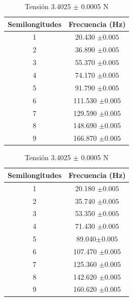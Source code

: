 \documentclass[10pt,a4paper]{article}
\begin{document}
\begin{table}[H]
    \centering
\begin{minipage}[t]{0.48\linewidth}\centering
\caption{Tensión 3.6695 $\pm$ 0.0005 N}
\label{tab:The parameters 2 }
\begin{tabular}{ c c }
\toprule
Semilongitudes &Frecuencia (Hz)      \\
\midrule

1 & 20.430 $\pm0.005$      \\
2& 36.890 $\pm0.005$     \\
3& 55.370 $\pm0.005$     \\
4& 74.170 $\pm0.005$     \\
5&91.790 $\pm0.005$     \\
6&111.530 $\pm0.005$     \\
7&129.590 $\pm0.005$     \\
8&148.690 $\pm0.005$     \\
9 & 166.870 $\pm0.005$ \\
\bottomrule
\end{tabular}
\end{minipage}\hfill%
\begin{minipage}[t]{0.48\linewidth}\centering
\caption{Tensión 3.4025 $\pm$ 0.0005 N}
\label{tab:The parameters 2 }
\begin{tabular}{ c c }
\toprule
Semilongitudes &Frecuencia (Hz)      \\
\midrule

1 & 20.180 $\pm0.005$      \\
2& 35.740 $\pm0.005$     \\
3& 53.350 $\pm0.005$     \\
4& 71.430 $\pm0.005$     \\
5& 89.040$\pm0.005$     \\
6&107.470 $\pm0.005$     \\
7&125.360 $\pm0.005$     \\
8&142.620 $\pm0.005$     \\
9 & 160.620 $\pm0.005$ \\
\bottomrule
\end{tabular}
\end{minipage}
\end{table}
\end{document}
